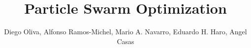 \title{Particle Swarm Optimization}
\label{chp:particle-swarm-optimization}
\author{Diego Oliva, Alfonso Ramos-Michel, Mario A. Navarro, Eduardo H. Haro, Angel Casas}
\maketitle










